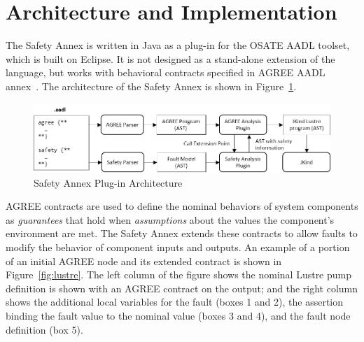 \section{Architecture and Implementation}
\label{sec:implementation}

The Safety Annex is written in Java as a plug-in for the OSATE AADL toolset, which is built on Eclipse.  It is not designed as a stand-alone extension of the language, but works with behavioral contracts specified in AGREE AADL annex~\cite{NFM2012:CoGaMiWhLaLu}. 
The architecture of the Safety Annex is shown in Figure~\ref{fig:plugin-arch}.



\begin{figure}
	\begin{center}
		\includegraphics[width=.9\textwidth]{images/arch.png}
	\end{center}
	\vspace{-0.2in}
	\caption{Safety Annex Plug-in Architecture}
	\label{fig:plugin-arch}
	\vspace{-0.2in}
\end{figure}


AGREE contracts are used to define the nominal behaviors of system components as {\em guarantees} that hold when {\em assumptions} about the values the component's environment are met.  The Safety Annex extends these contracts to allow faults to modify the behavior of component inputs and outputs. 
An example of a portion of an initial AGREE node and its extended contract is shown in Figure~\ref{fig:lustre}. The left column of the figure shows the nominal Lustre pump definition is shown with an AGREE contract on the output; and the right column shows the additional local variables for the fault (boxes 1 and 2), the assertion binding the fault value to the nominal value (boxes 3 and 4), and the fault node definition (box 5).

